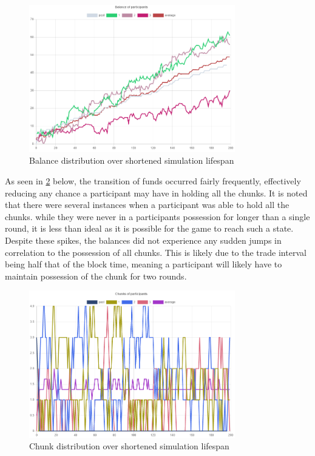 \begin{figure}[H]
  \centering
  \caption{Balance distribution over shortened simulation lifespan}
  \label{figure:simulation-balance}
  \includegraphics[width=0.8\textwidth]{media/simulation-balance.PNG}
\end{figure}

As seen in \cref{figure:simulation-chunks} below, the transition of funds occurred fairly frequently, effectively reducing any chance a participant may have in holding all the chunks. It is noted that there were several instances when a participant was able to hold all the chunks. while they were never in a participants possession for longer than a single round, it is less than ideal as it is possible for the game to reach such a state. Despite these spikes, the balances did not experience any sudden jumps in correlation to the possession of all chunks. This is likely due to the trade interval being half that of the block time, meaning a participant will likely have to maintain possession of the chunk for two rounds. 

\begin{figure}[H]
  \centering
  \caption{Chunk distribution over shortened simulation lifespan}
  \label{figure:simulation-chunks}
  \includegraphics[width=0.8\textwidth]{media/simulation-chunks.PNG}
\end{figure}

